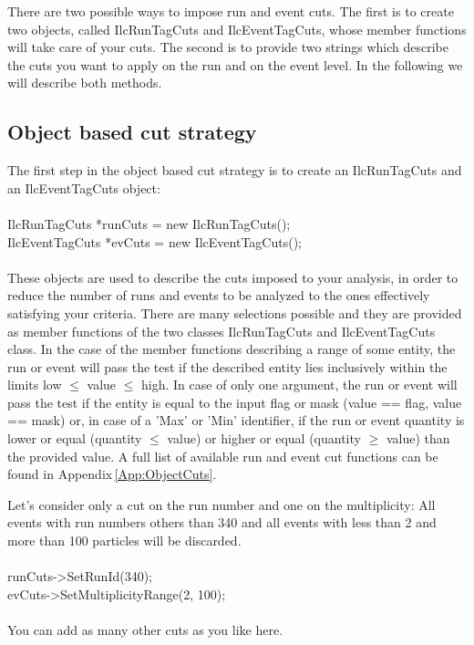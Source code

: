 There are two possible ways to impose run and event cuts. The first is to create two objects, called {\ttfamily IlcRunTagCuts} and {\ttfamily IlcEventTagCuts}, whose member functions will take care of your cuts. The second is to provide two strings which describe the cuts you want to apply on the run and on the event level. In the following we will describe both methods.


\subsection{Object based cut strategy}
The first step in the object based cut strategy is to create an {\ttfamily IlcRunTagCuts} and an {\ttfamily IlcEventTagCuts} object:\\
\\
{\ttfamily IlcRunTagCuts *runCuts = new IlcRunTagCuts();}\\
{\ttfamily IlcEventTagCuts *evCuts = new IlcEventTagCuts();}\\
\\
These objects are used to describe the cuts imposed to your analysis, in order to reduce the number of runs and events to be analyzed to the ones effectively satisfying your criteria. There are many selections possible and they are provided as member functions of the two classes {\ttfamily IlcRunTagCuts} and {\ttfamily IlcEventTagCuts} class. In the case of the member functions describing a range of some entity, the run or event will pass the test if the described entity lies inclusively within the limits {\ttfamily low $\le$ value $\le$ high}. In case of only one argument, the run or event will pass the test if the entity is equal to the input flag or mask ({\ttfamily value == flag}, {\ttfamily value == mask}) or, in case of a 'Max' or 'Min' identifier, if the run or event quantity is lower or equal ({\ttfamily quantity $\le$ value}) or higher or equal ({\ttfamily quantity $\ge$ value}) than the provided value. A full list of available run and event cut functions can be found in Appendix\,\ref{App:ObjectCuts}.

Let's consider only a cut on the run number and one on the multiplicity: All events with run numbers others than 340 and all events with less than 2 and more than 100 particles will be discarded.\\
\\
{\ttfamily runCuts->SetRunId(340);}\\
{\ttfamily evCuts->SetMultiplicityRange(2, 100);}\\
\\
You can add as many other cuts as you like here.

